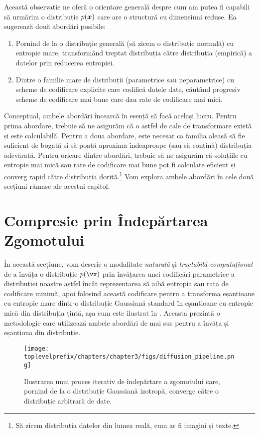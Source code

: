 \documentclass[../../book-main_ro.tex]{subfiles}
\begin{document}
Această observație ne oferă o orientare generală despre cum am putea fi capabili să urmărim o distribuție $p(\bm{x})$ care are o structură cu dimensiuni reduse. Ea sugerează două abordări posibile:
\begin{enumerate}
	\item Pornind de la o distribuție generală (să zicem o distribuție normală) cu entropie mare, transformând treptat distribuția către distribuția (empirică) a datelor prin reducerea entropiei.
	\item Dintre o familie mare de distribuții (parametrice sau neparametrice) cu scheme de codificare explicite care codifică datele date, căutând progresiv scheme de codificare mai bune care dau rate de codificare mai mici.
\end{enumerate}
Conceptual, ambele abordări încearcă în esență să facă același lucru. Pentru prima abordare, trebuie să ne asigurăm că o astfel de cale de transformare există și este calculabilă. Pentru a doua abordare, este necesar ca familia aleasă să fie suficient de bogată și să poată aproxima îndeaproape (sau să conțină) distribuția adevărată. Pentru oricare dintre abordări, trebuie să ne asigurăm că soluțiile cu entropie mai mică sau rate de codificare mai bune pot fi calculate eficient și converg rapid către distribuția dorită.\footnote{Să zicem distribuția datelor din lumea reală, cum ar fi imagini și texte.} Vom explora ambele abordări în cele două secțiuni rămase ale acestui capitol.  %

\section{Compresie prin Îndepărtarea Zgomotului}\label{sub:compression_denoising}

În această secțiune, vom descrie o modalitate \textit{naturală} și \textit{tractabilă computațional} de a învăța o distribuție \(p(\vx)\) prin învățarea unei codificări parametrice a distribuției noastre astfel încât reprezentarea să aibă entropia sau rata de codificare minimă, apoi folosind această codificare pentru a transforma eșantioane cu entropie mare dintr-o distribuție Gaussiană standard în eșantioane cu entropie mică din distribuția țintă, așa cum este ilustrat în . Aceasta prezintă o metodologie care utilizează ambele abordări de mai sus pentru a învăța și eșantiona din distribuție.

\begin{figure}[t]
	\centering
	\texttt{[image: \\toplevelprefix/chapters/chapter3/figs/diffusion\_pipeline.png]}
	\caption{Ilustrarea unui proces iterativ de îndepărtare a zgomotului care, pornind de la o distribuție Gaussiană izotropă, converge către o distribuție arbitrară de date.}
	\label{fig:diffusion-chapter3}
\end{figure}
\end{document}
